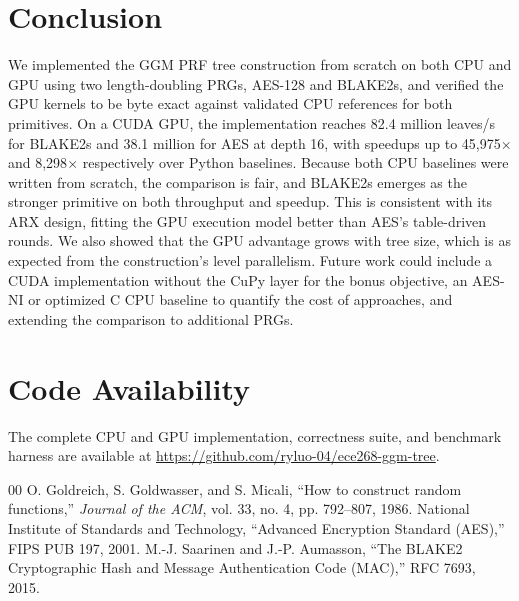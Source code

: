 \documentclass[conference]{IEEEtran}
\begin{document}
\section{Conclusion}
We implemented the GGM PRF tree construction from scratch on both CPU and GPU using two length-doubling PRGs, AES-128 and BLAKE2s, and verified the GPU kernels to be byte exact against validated CPU references for both primitives. On a CUDA GPU, the implementation reaches 82.4 million leaves/s for BLAKE2s and 38.1 million for AES at depth 16, with speedups up to 45,975$\times$ and 8,298$\times$ respectively over Python baselines. Because both CPU baselines were written from scratch, the comparison is fair, and BLAKE2s emerges as the stronger primitive on both throughput and speedup. This is consistent with its ARX design, fitting the GPU execution model better than AES's table-driven rounds. We also showed that the GPU advantage grows with tree size, which is as expected from the construction's level parallelism. Future work could include a CUDA implementation without the CuPy layer for the bonus objective, an AES-NI or optimized C CPU baseline to quantify the cost of approaches, and extending the comparison to additional PRGs.

\section*{Code Availability}
The complete CPU and GPU implementation, correctness suite, and benchmark harness are available at \url{https://github.com/ryluo-04/ece268-ggm-tree}.

\begin{thebibliography}{00}
 O. Goldreich, S. Goldwasser, and S. Micali, ``How to construct random functions,'' \textit{Journal of the ACM}, vol. 33, no. 4, pp. 792--807, 1986.
 National Institute of Standards and Technology, ``Advanced Encryption Standard (AES),'' FIPS PUB 197, 2001.
 M.-J. Saarinen and J.-P. Aumasson, ``The BLAKE2 Cryptographic Hash and Message Authentication Code (MAC),'' RFC 7693, 2015.
\end{thebibliography}
\end{document}
